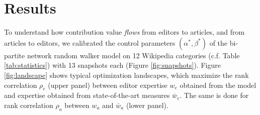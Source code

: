 \section{Results}
To understand how contribution value {\it flows} from editors to articles, and from articles to editors, we calibrated the control parameters $(\alpha^*,\beta^*)$ of the bi-partite network random walker model on 12 Wikipedia categories (c.f. Table \ref{tab:statistics}) with 13 snapshots each (Figure \ref{fig:snapshots}). Figure \ref{fig:landscape} shows typical optimization landscapes, which maximize the rank correlation $\rho_e$ (upper panel) between editor expertise $w_{e}$ obtained from the model and expertise obtained from state-of-the-art measures $\bar{w}_e$. The same is done for rank correlation $\rho_a$ between $w_a$ and $\bar{w}_a$ (lower panel). 

